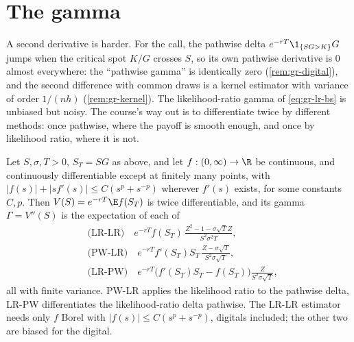 \section{The gamma}\label{sec:gr-gamma}

A second derivative is harder. For the call, the pathwise delta
$e^{-rT}\1_{\{SG>K\}}G$ jumps when the critical spot $K/G$ crosses $S$, so its own pathwise
derivative is $0$ almost everywhere: the ``pathwise gamma'' is identically zero
(\cref{rem:gr-digital}), and the second difference with common draws is a kernel estimator with
variance of order $1/(nh)$ (\cref{rem:gr-kernel}). The likelihood-ratio gamma of
\eqref{eq:gr-lr-bs} is unbiased but noisy. The course's way out is to differentiate twice by
different methods: once pathwise, where the payoff is smooth enough, and once by likelihood
ratio, where it is not.

\begin{proposition}\label{prop:gr-hybrid-gamma}
Let $S,\sigma,T>0$, $S_T=SG$ as above, and let $f:(0,\infty)\to\R$ be continuous, and
continuously differentiable except at finitely many points, with $|f(s)|+|sf'(s)|\le C(s^p+s^{-p})$
wherever $f'(s)$ exists, for some constants $C,p$.
Then $V(S)=e^{-rT}\E f(S_T)$ is twice differentiable, and its gamma $\Gamma=V''(S)$ is the
expectation of each of
\[
\begin{aligned}
  &\text{(LR-LR)}\quad e^{-rT}f(S_T)\,\frac{Z^2-1-\sigma\sqrt TZ}{S^2\sigma^2T},\\
  &\text{(PW-LR)}\quad e^{-rT}f'(S_T)S_T\,\frac{Z-\sigma\sqrt T}{S^2\sigma\sqrt T},\\
  &\text{(LR-PW)}\quad e^{-rT}\big(f'(S_T)S_T-f(S_T)\big)\frac{Z}{S^2\sigma\sqrt T},
\end{aligned}
\]
all with finite variance. PW-LR applies the likelihood ratio to the pathwise delta, LR-PW
differentiates the likelihood-ratio delta pathwise. The LR-LR estimator needs only $f$ Borel
with $|f(s)|\le C(s^p+s^{-p})$, digitals included; the other two are biased for the digital.
\end{proposition}

